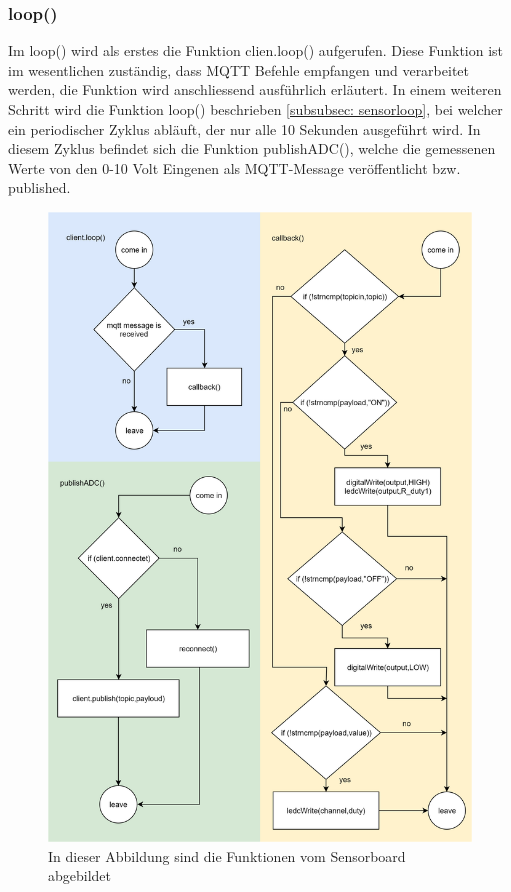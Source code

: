 \subsubsection{loop()}
Im loop() wird als erstes die Funktion clien.loop() aufgerufen. Diese Funktion ist im wesentlichen zuständig, dass MQTT Befehle empfangen und verarbeitet werden, die Funktion wird anschliessend ausführlich erläutert. In einem weiteren Schritt wird die Funktion loop() beschrieben \ref{subsubsec: sensorloop}, bei welcher ein periodischer Zyklus abläuft, der nur alle 10 Sekunden ausgeführt wird. In diesem Zyklus befindet sich die Funktion publishADC(), welche die gemessenen Werte von den 0-10 Volt Eingenen als MQTT-Message veröffentlicht bzw. published.
\begin{figure}[H]
	\centering
	\includegraphics[width=\textwidth]{graphics/FunktionenAktor.png}
	\caption{In dieser Abbildung sind die Funktionen vom Sensorboard abgebildet}
	\label{pic: funktionen Aktor}
\end{figure}   
